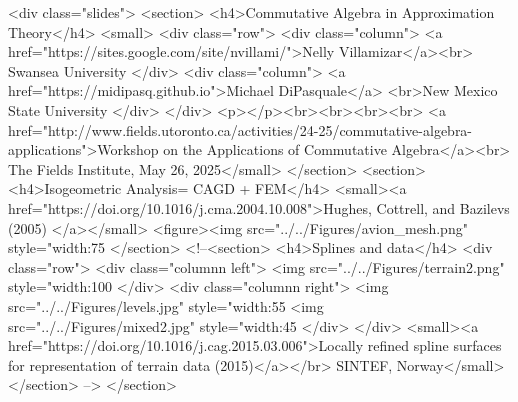    <div class="slides">
<section>
    <h4>Commutative Algebra in Approximation Theory</h4>
    <small>
  <div class="row">
  <div class="column">
<a href="https://sites.google.com/site/nvillami/">Nelly Villamizar</a><br>
 Swansea University
  </div>
  <div class="column">
<a href="https://midipasq.github.io">Michael DiPasquale</a>
    <br>New Mexico State University
  </div>
</div>   
<p></p><br><br><br><br>  
<a href="http://www.fields.utoronto.ca/activities/24-25/commutative-algebra-applications">Workshop on the Applications of Commutative Algebra</a><br>  
The Fields Institute, May 26, 2025</small>
 </section>
<section>
 <h4>Isogeometric Analysis= CAGD + FEM</h4>
 <small><a href="https://doi.org/10.1016/j.cma.2004.10.008">Hughes, Cottrell, and Bazilevs (2005) </a></small> 
 <figure><img src="../../Figures/avion_mesh.png" style="width:75%
 </section>
<!--<section>
<h4>Splines and data</h4>
 <div class="row">
  <div class="columnn left">
<img src="../../Figures/terrain2.png" style="width:100%
  </div>
 <div class="columnn right">
 <img src="../../Figures/levels.jpg" style="width:55%
 <img src="../../Figures/mixed2.jpg" style="width:45%
 </div>
</div>
  <small><a href="https://doi.org/10.1016/j.cag.2015.03.006">Locally refined spline surfaces for representation of terrain data (2015)</a></br>
SINTEF, Norway</small>
</section>
-->
</section>


